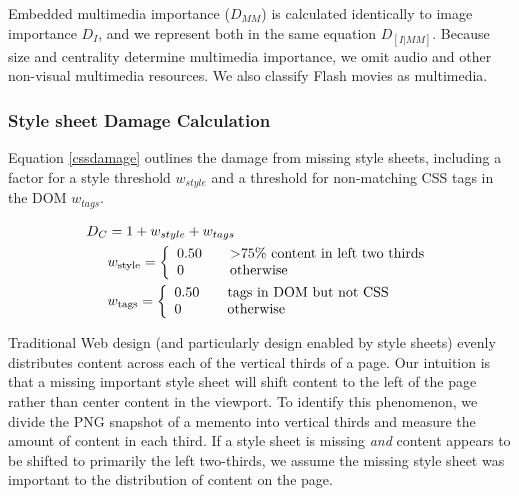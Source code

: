 Embedded multimedia importance ($D_{MM}$) is calculated identically to image importance $D_I$, and we represent both in the same equation $D_{[I|MM]}$. Because size and centrality determine multimedia importance, we omit audio and other non-visual multimedia resources. We also classify Flash movies as multimedia.


\subsubsection{Style sheet Damage Calculation}
Equation \ref{cssdamage} outlines the damage from missing style sheets, including a factor for a style threshold $w_{style}$ and a threshold for non-matching CSS tags in the DOM $w_{tags}$. 


\begin{equation}
\label{cssdamage}
\begin{split}
D_C &= 1 + w_{style} + w_{tags}\\
&w_{\text{style}} =  \left\{
  \begin{array}{l l}
    0.50 & \quad \text{\textgreater 75\% content in left two thirds}\\
    0    & \quad \text{otherwise}
  \end{array} \right.\\
&w_{\text{tags}} =  \left\{
  \begin{array}{l l}
    0.50 & \quad \text{tags in DOM but not CSS}\\
    0    & \quad \text{otherwise}
  \end{array} \right.
\end{split}
\end{equation}


Traditional Web design (and particularly design enabled by style sheets) evenly distributes content across each of the vertical thirds of a page. Our intuition is that a missing important style sheet will shift content to the left of the page rather than center content in the viewport. To identify this phenomenon, we divide the PNG snapshot of a memento into vertical thirds and measure the amount of content in each third. If a style sheet is missing \emph{and} content appears to be shifted to primarily the left two-thirds, we assume the missing style sheet was important to the distribution of content on the page.


